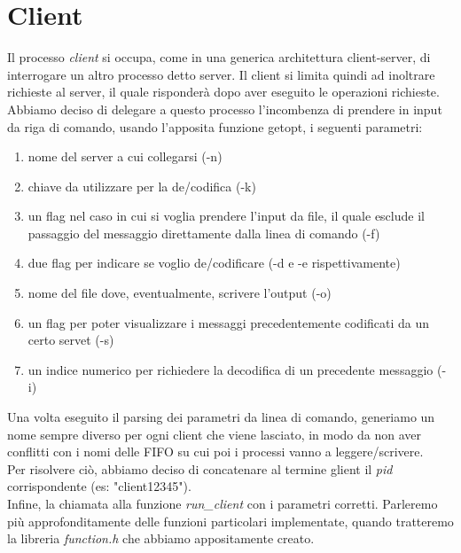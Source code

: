 \documentclass[a4paper,9pt]{article}
\begin{document}
\section{Client}
Il processo \emph{client} si occupa, come in una generica architettura client-server, di interrogare un altro processo detto server. Il client si limita quindi ad inoltrare richieste al server, il quale risponderà dopo aver eseguito le operazioni richieste.\\
Abbiamo deciso di delegare a questo processo l'incombenza di prendere in input da riga di comando, usando l'apposita funzione getopt, i seguenti parametri:
\begin{enumerate}
\item nome del server a cui collegarsi (-n)
\item chiave da utilizzare per la de/codifica (-k)
\item un flag nel caso in cui si voglia prendere l'input da file, il quale esclude il passaggio del messaggio direttamente dalla linea di comando (-f)
\item due flag per indicare se voglio de/codificare (-d e -e rispettivamente)
\item nome del file dove, eventualmente, scrivere l'output (-o)
\item un flag per poter visualizzare i messaggi precedentemente codificati da un certo servet (-s)
\item un indice numerico per richiedere la decodifica di un precedente messaggio (-i)
\end{enumerate}
Una volta eseguito il parsing dei parametri da linea di comando, generiamo un nome sempre diverso per ogni client che viene lasciato, in modo da non aver conflitti con i nomi delle FIFO su cui poi i processi vanno a leggere/scrivere.\\
Per risolvere ciò, abbiamo deciso di concatenare al termine glient il \emph{pid} corrispondente (es: "client12345").\\
Infine, la chiamata alla funzione \emph{run\_client} con i parametri corretti. Parleremo più approfonditamente delle funzioni particolari implementate, quando tratteremo la libreria \emph{function.h} che abbiamo appositamente creato.
\end{document}
